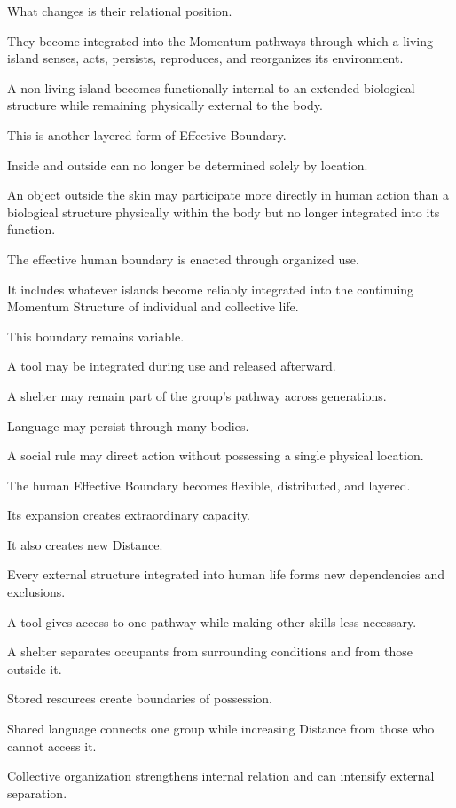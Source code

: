 What changes is their relational position.

They become integrated into the Momentum pathways through which a living island senses, acts, persists, reproduces, and reorganizes its environment.

A non-living island becomes functionally internal to an extended biological structure while remaining physically external to the body.

This is another layered form of Effective Boundary.

Inside and outside can no longer be determined solely by location.

An object outside the skin may participate more directly in human action than a biological structure physically within the body but no longer integrated into its function.

The effective human boundary is enacted through organized use.

It includes whatever islands become reliably integrated into the continuing Momentum Structure of individual and collective life.

This boundary remains variable.

A tool may be integrated during use and released afterward.

A shelter may remain part of the group’s pathway across generations.

Language may persist through many bodies.

A social rule may direct action without possessing a single physical location.

The human Effective Boundary becomes flexible, distributed, and layered.

Its expansion creates extraordinary capacity.

It also creates new Distance.

Every external structure integrated into human life forms new dependencies and exclusions.

A tool gives access to one pathway while making other skills less necessary.

A shelter separates occupants from surrounding conditions and from those outside it.

Stored resources create boundaries of possession.

Shared language connects one group while increasing Distance from those who cannot access it.

Collective organization strengthens internal relation and can intensify external separation.

